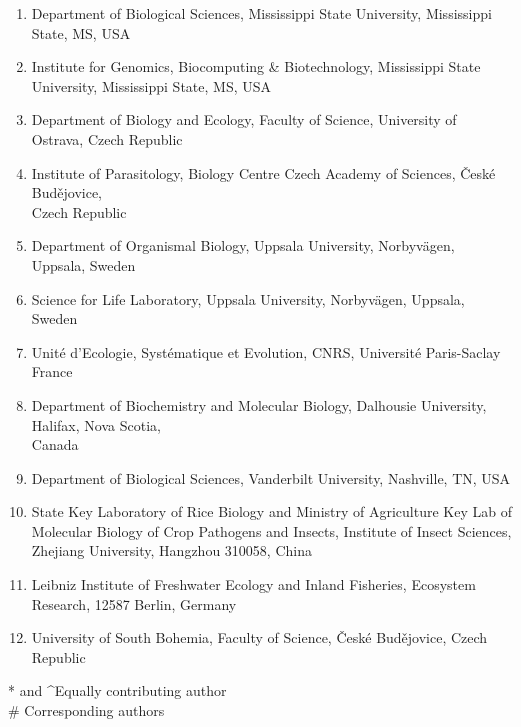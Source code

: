 \documentclass{article}
\begin{document}
\begin{titlepage}
        \begin{enumerate}
            \itemsep0em
            \item Department of Biological Sciences, Mississippi State University, Mississippi State, MS, USA \label{ins:msu_bio}
            \item Institute for Genomics, Biocomputing \& Biotechnology, Mississippi State University, Mississippi State, MS, USA \label{ins:msu_igbb}
            \item Department of Biology and Ecology, Faculty of Science, University of Ostrava, Czech Republic \label{ins:ost_bio}
            \item Institute of Parasitology, Biology Centre Czech Academy of Sciences, České Budějovice,\\ Czech Republic \label{ins:ceske_paras}
            \item Department of Organismal Biology, Uppsala University, Norbyvägen, Uppsala, Sweden \label{ins:upp_bio}
            \item Science for Life Laboratory, Uppsala University, Norbyvägen, Uppsala, Sweden \label{ins:upp_life}
            \item Unité d’Ecologie, Systématique et Evolution, CNRS, Université Paris-Saclay France \label{ins:paris}
            \item Department of Biochemistry and Molecular Biology, Dalhousie University, Halifax, Nova Scotia,\\ Canada \label{ins:dalh}
            \item Department of Biological Sciences, Vanderbilt University, Nashville, TN, USA\label{ins:Van}
            \item State Key Laboratory of Rice Biology and Ministry of Agriculture Key Lab of Molecular Biology of Crop Pathogens and Insects, Institute of Insect Sciences, Zhejiang University, Hangzhou 310058, China \label{ins:China}
            \item Leibniz Institute of Freshwater Ecology and Inland Fisheries, Ecosystem Research, 12587 Berlin, Germany \label{ins:Germ}
            \item University of South Bohemia, Faculty of Science, České Budějovice, Czech Republic \label{ins:ceske_bohe}
        \end{enumerate}
        * and \textasciicircum \space Equally contributing author \\
        \# Corresponding authors


       \vfill
       
    \end{titlepage}
    \tableofcontents
    
\end{document}
